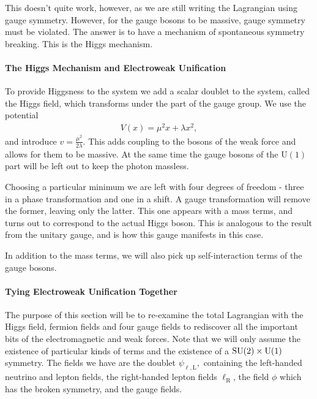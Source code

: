 This doesn't quite work, however, as we are still writing the Lagrangian using gauge symmetry. However, for the gauge bosons to be massive, gauge symmetry must be violated. The answer is to have a mechanism of spontaneous symmetry breaking. This is the Higgs mechanism.

\paragraph{The Higgs Mechanism and Electroweak Unification}
To provide Higgsness to the system we add a scalar doublet to the system, called the Higgs field, which transforms under the  part of the gauge group. We use the potential
\begin{align*}
	V(x) = \mu^{2}x + \lambda x^{2},
\end{align*}
and introduce $v = \frac{\mu^{2}}{2\lambda}$. This adds coupling to the bosons of the weak force and allows for them to be massive. At the same time the gauge bosons of the $\text{U}(1)$ part will be left out to keep the photon massless.

Choosing a particular minimum we are left with four degrees of freedom - three in a phase transformation and one in a shift. A gauge transformation will remove the former, leaving only the latter. This one appears with a mass terms, and turns out to correspond to the actual Higgs boson. This is analogous to the result from the unitary gauge, and is how this gauge manifests in this case.

In addition to the mass terms, we will also pick up self-interaction terms of the gauge bosons.

\paragraph{Tying Electroweak Unification Together}
The purpose of this section will be to re-examine the total Lagrangian with the Higgs field, fermion fields and four gauge fields to rediscover all the important bits of the electromagnetic and weak forces. Note that we will only assume the existence of particular kinds of terms and the existence of a $\text{SU}(2)\times \text{U}(1)$ symmetry. The fields we have are the doublet $\psi_{\ell, \text{L}},$ containing the left-handed neutrino and lepton fields, the right-handed lepton fields $\ell_{\text{R}}$, the field $\phi$ which has the broken symmetry, and the gauge fields.

